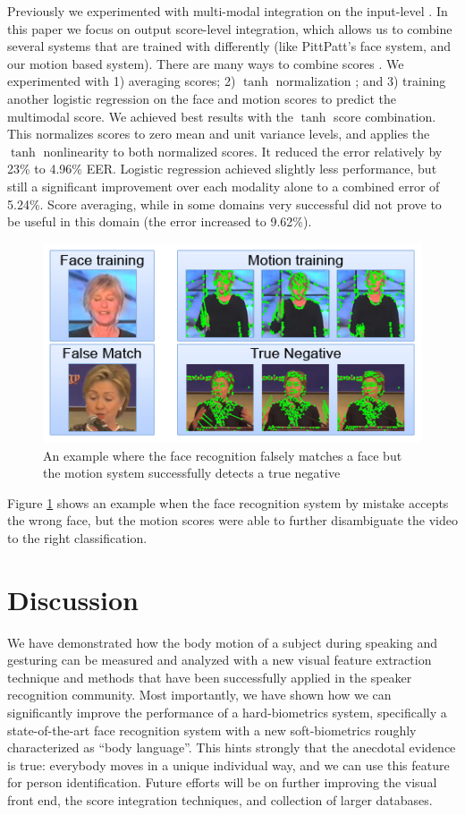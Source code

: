 \documentclass[times, 10pt,twocolumn]{article}
\begin{document}
Previously we experimented with multi-modal integration on the input-level  \cite{breglerICASSP09}.  In this paper we focus on output score-level integration, which allows us to combine several systems that are trained with differently (like PittPatt's face system, and our motion based system).  There are many ways to combine scores \cite{jain2005score}.  We experimented with 1) averaging scores; 2) $\tanh$ normalization \cite{jain2005score}; and 3) training another logistic regression on the face and motion scores to predict the multimodal score.  We achieved best results with the $\tanh$ score combination.  This normalizes scores to zero mean and unit variance levels, and applies the $\tanh$ nonlinearity to both normalized scores. It reduced the error relatively by 23\% to 4.96\% EER.  Logistic regression achieved slightly less performance, but still a significant improvement over each modality alone to a combined error of 5.24\%.  Score averaging, while in some domains very successful did not prove to be useful in this domain (the error increased to 9.62\%).
\begin{figure}[bt]
\centering
\includegraphics[width=0.96\columnwidth]{fig_example_v2}
\caption{\label{fig_example}\small An example where the face recognition falsely matches a face but the motion system successfully detects a true negative}
\end{figure}
Figure \ref{fig_example} shows an example when the face recognition system by mistake accepts the wrong face, but the motion scores were able to further disambiguate the video to the right classification.


\section{Discussion}
We have demonstrated how the body motion of a subject during speaking and gesturing can be measured and analyzed with a new visual feature extraction technique and methods that have been successfully applied in the speaker recognition community.  Most importantly, we have shown how we can significantly improve the performance of a hard-biometrics system, specifically a state-of-the-art face recognition system with a new soft-biometrics roughly characterized as ``body language''.  This hints strongly that the anecdotal evidence is true: everybody moves in a unique individual way, and we can use this feature for person identification.  Future efforts will be on further improving the visual front end, the score integration techniques, and collection of larger databases.
\end{document}

